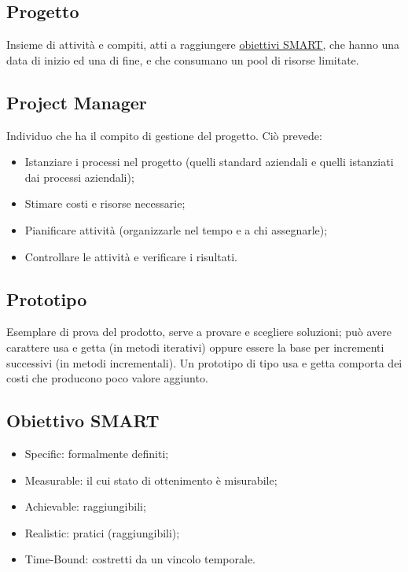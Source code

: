 	\subsection{Progetto}
	\label{sec:progetto}
	Insieme di attività e compiti, atti a raggiungere \underline{\hyperref[sec:smart]{obiettivi SMART}}, che hanno una data di inizio ed una di fine, e che consumano un pool di risorse limitate.	
	
	\subsection{Project Manager}
	\label{sec:projectmanager}
	Individuo che ha il compito di gestione del progetto. Ciò prevede:
	\begin{itemize}  
	\item Istanziare i processi nel progetto (quelli standard aziendali e quelli istanziati dai processi aziendali);
	\item Stimare costi e risorse necessarie;
	\item Pianificare attività (organizzarle nel tempo e a chi assegnarle);
	\item Controllare le attività e verificare i risultati.
	\end{itemize}	
		
	\subsection{Prototipo}
	\label{sec:prototipo}
	Esemplare di prova del prodotto, serve a provare e scegliere soluzioni; può avere carattere usa e getta (in metodi iterativi) oppure essere la base per incrementi successivi (in metodi incrementali).
	Un prototipo di tipo usa e getta comporta dei costi che producono poco valore aggiunto.\newpage	


		
	\subsection{Obiettivo SMART}
	\label{sec:smart}
	\begin{itemize}  
	\item Specific: formalmente definiti;
	\item Measurable: il cui stato di ottenimento è misurabile;
	\item Achievable: raggiungibili;
	\item Realistic: pratici (raggiungibili);
	\item Time-Bound: costretti da un vincolo temporale.
	\end{itemize}\newpage

